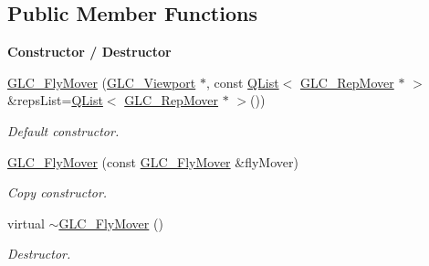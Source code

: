 \subsection*{Public Member Functions}
\begin{Indent}{\bf Constructor / Destructor}\par
\begin{DoxyCompactItemize}
\item 
\hyperlink{class_g_l_c___fly_mover_ae313d05b8ac4a3bf7df214fb86745627}{G\-L\-C\-\_\-\-Fly\-Mover} (\hyperlink{class_g_l_c___viewport}{G\-L\-C\-\_\-\-Viewport} $\ast$, const \hyperlink{class_q_list}{Q\-List}$<$ \hyperlink{class_g_l_c___rep_mover}{G\-L\-C\-\_\-\-Rep\-Mover} $\ast$ $>$ \&reps\-List=\hyperlink{class_q_list}{Q\-List}$<$ \hyperlink{class_g_l_c___rep_mover}{G\-L\-C\-\_\-\-Rep\-Mover} $\ast$ $>$())
\begin{DoxyCompactList}\small\item\em Default constructor. \end{DoxyCompactList}\item 
\hyperlink{class_g_l_c___fly_mover_a659d95d6219351cc6908ab168ed22f01}{G\-L\-C\-\_\-\-Fly\-Mover} (const \hyperlink{class_g_l_c___fly_mover}{G\-L\-C\-\_\-\-Fly\-Mover} \&fly\-Mover)
\begin{DoxyCompactList}\small\item\em Copy constructor. \end{DoxyCompactList}\item 
virtual \hyperlink{class_g_l_c___fly_mover_a77b69ecd36e9ab6b2221f12932b6c91a}{$\sim$\-G\-L\-C\-\_\-\-Fly\-Mover} ()
\begin{DoxyCompactList}\small\item\em Destructor. \end{DoxyCompactList}\end{DoxyCompactItemize}
\end{Indent}
